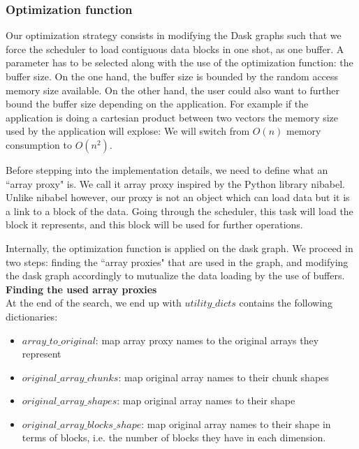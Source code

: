 \documentclass[conference]{IEEEtran}
\begin{document}

\subsubsection{Optimization function}
Our optimization strategy consists in modifying the Dask graphs such that we force the scheduler to load contiguous data blocks in one shot, as one buffer. A parameter has to be selected along with the use of the optimization function: the buffer size. On the one hand, the buffer size is bounded by the random access memory size available. On the other hand, the user could also want to further bound the buffer size depending on the application. For example if the application is doing a cartesian product between two vectors the memory size used by the application will explose: We will switch from $O(n)$ memory consumption to $O(n^2)$.

Before stepping into the implementation details, we need to define what an ``array proxy" is. We call it array proxy inspired by the Python library nibabel. Unlike nibabel however, our proxy is not an object which can load data but it is a link to a block of the data. Going through the scheduler, this task will load the block it represents, and this block will be used for further operations.

Internally, the optimization function is applied on the dask graph. We proceed in two steps: finding the ``array proxies" that are used in the graph, and modifying the dask graph accordingly to mutualize the data loading by the use of buffers. \\

\textbf{Finding the used array proxies} \\


At the end of the search, we end up with $utility\_dicts$ contains the following dictionaries:
\begin{itemize}
  \item $array\_to\_original$: map array proxy names to the original arrays they represent
  \item $original\_array\_chunks$: map original array names to their chunk shapes
  \item $original\_array\_shapes$: map original array names to their shape
  \item $original\_array\_blocks\_shape$: map original array names to their shape in terms of blocks, i.e. the number of blocks they have in each dimension.
\end{itemize}
\end{document}
